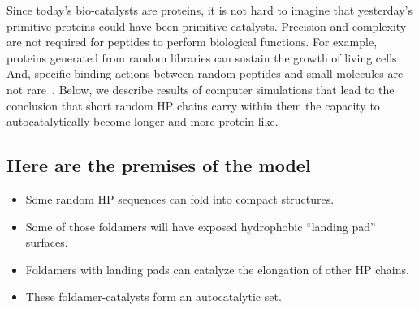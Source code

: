 \documentclass[5p,times]{elsarticle}
\begin{document}
 Since today's bio-catalysts are proteins, it is not hard to imagine that yesterday's primitive 
proteins could have been primitive catalysts.  Precision and complexity are not required for 
peptides to perform biological functions. For example, proteins generated from random libraries can 
sustain the growth of living cells~\cite{Fisher2011}.  And, specific binding actions between random 
peptides and small molecules are not rare~\cite{Cherny2012}.  Below, we describe results of 
computer simulations that lead to 
the conclusion that short random HP chains carry within them the capacity to autocatalytically 
become longer and more protein-like.  

\subsection{Here are the premises of the model}
 
 \begin{itemize}
 \item Some random HP sequences can fold into compact structures.
 \item Some of those foldamers will have exposed hydrophobic ``landing pad'' surfaces.
 \item Foldamers with landing pads can catalyze the elongation of other HP chains.
 \item These foldamer-catalysts form an autocatalytic set.
\end{itemize}
\end{document}
